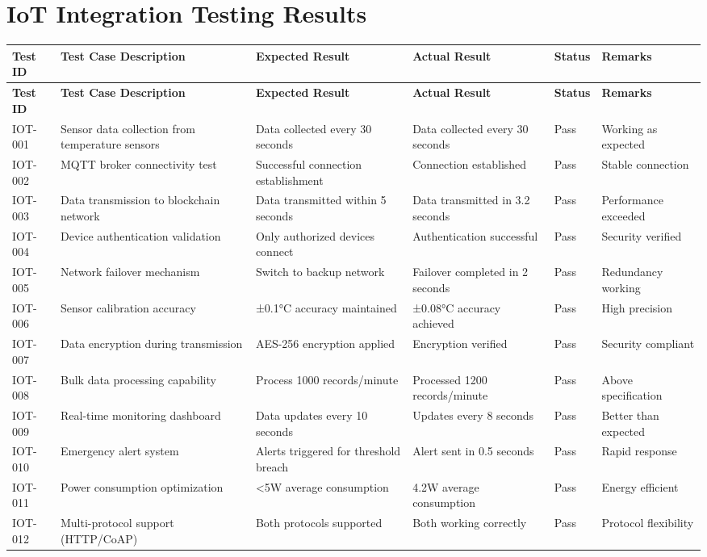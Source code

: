 \documentclass[oneside,a4paper,12pt]{book}
\begin{document}
\section{IoT Integration Testing Results}
\small %
\begin{longtable}{|p{1.2cm}|p{3cm}|p{2.3cm}|p{2.3cm}|p{1.5cm}|p{2cm}|}
\hline
\textbf{Test ID} & \textbf{Test Case Description} & \textbf{Expected Result} & \textbf{Actual Result} & \textbf{Status} & \textbf{Remarks} \\
\hline
\endfirsthead

\hline
\textbf{Test ID} & \textbf{Test Case Description} & \textbf{Expected Result} & \textbf{Actual Result} & \textbf{Status} & \textbf{Remarks} \\
\hline
\endhead

IOT-001 & Sensor data collection from temperature sensors & Data collected every 30 seconds & Data collected every 30 seconds & Pass & Working as expected \\
\hline
IOT-002 & MQTT broker connectivity test & Successful connection establishment & Connection established & Pass & Stable connection \\
\hline
IOT-003 & Data transmission to blockchain network & Data transmitted within 5 seconds & Data transmitted in 3.2 seconds & Pass & Performance exceeded \\
\hline
IOT-004 & Device authentication validation & Only authorized devices connect & Authentication successful & Pass & Security verified \\
\hline
IOT-005 & Network failover mechanism & Switch to backup network & Failover completed in 2 seconds & Pass & Redundancy working \\
\hline
IOT-006 & Sensor calibration accuracy & ±0.1°C accuracy maintained & ±0.08°C accuracy achieved & Pass & High precision \\
\hline
IOT-007 & Data encryption during transmission & AES-256 encryption applied & Encryption verified & Pass & Security compliant \\
\hline
IOT-008 & Bulk data processing capability & Process 1000 records/minute & Processed 1200 records/minute & Pass & Above specification \\
\hline
IOT-009 & Real-time monitoring dashboard & Data updates every 10 seconds & Updates every 8 seconds & Pass & Better than expected \\
\hline
IOT-010 & Emergency alert system & Alerts triggered for threshold breach & Alert sent in 0.5 seconds & Pass & Rapid response \\
\hline
IOT-011 & Power consumption optimization & <5W average consumption & 4.2W average consumption & Pass & Energy efficient \\
\hline
IOT-012 & Multi-protocol support (HTTP/CoAP) & Both protocols supported & Both working correctly & Pass & Protocol flexibility \\
\hline

\end{longtable}
\end{document}
